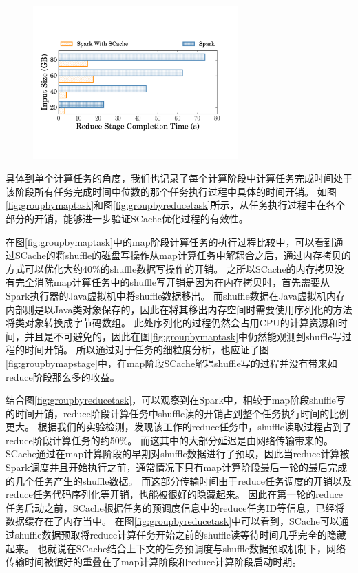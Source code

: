 \begin{figure}[!htp]
	\centering
	\includegraphics[width=0.7\textwidth]{../../PPoPP-2018/fig/groupbyreducestage.pdf}
\end{figure}

具体到单个计算任务的角度，我们也记录了每个计算阶段中计算任务完成时间处于该阶段所有任务完成时间中位数的那个任务执行过程中具体的时间开销。
如图\ref{fig:groupbymaptask}和图\ref{fig:groupbyreducetask}所示，从任务执行过程中在各个部分的开销，能够进一步验证SCache优化过程的有效性。

在图\ref{fig:groupbymaptask}中的map阶段计算任务的执行过程比较中，可以看到通过SCache的将shuffle的磁盘写操作从map计算任务中解耦合之后，通过内存拷贝的方式可以优化大约40\%的shuffle数据写操作的开销。
之所以SCache的内存拷贝没有完全消除map计算任务中的shuffle写开销是因为在内存拷贝时，首先需要从Spark执行器的Java虚拟机中将shuffle数据移出。
而shuffle数据在Java虚拟机内存内部则是以Java类对象保存的，因此在将其移出内存空间时需要使用序列化的方法将类对象转换成字节码数组。
此处序列化的过程仍然会占用CPU的计算资源和时间\cite{makingsense}，并且是不可避免的，因此在图\ref{fig:groupbymaptask}中仍然能观测到shuffle写过程的时间开销。
所以通过对于任务的细粒度分析，也应证了图\ref{fig:groupbymapstage}中，在map阶段SCache解耦shuffle写的过程并没有带来如reduce阶段那么多的收益。

结合图\ref{fig:groupbyreducetask}，可以观察到在Spark中，相较于map阶段shuffle写的时间开销，reduce阶段计算任务中shuffle读的开销占到整个任务执行时间的比例更大。
根据我们的实验检测，发现该工作的reduce任务中，shuffle读取过程占到了reduce阶段计算任务的约50\%。
而这其中的大部分延迟是由网络传输带来的。
SCache通过在map计算阶段的早期对shuffle数据进行了预取，因此当reduce计算被Spark调度并且开始执行之前，通常情况下只有map计算阶段最后一轮的最后完成的几个任务产生的shuffle数据。
而这部分传输时间由于reduce任务调度的开销以及reduce任务代码序列化等开销，也能被很好的隐藏起来。
因此在第一轮的reduce任务启动之前，SCache根据任务的预调度信息中的reduce任务ID等信息，已经将数据缓存在了内存当中。
在图\ref{fig:groupbyreducetask}中可以看到，SCache可以通过shuffle数据预取将reduce计算任务开始之前的shuffle读等待时间几乎完全的隐藏起来。
也就说在SCache结合上下文的任务预调度与shuffle数据预取机制下，网络传输时间被很好的重叠在了map计算阶段和reduce计算阶段启动时期。

